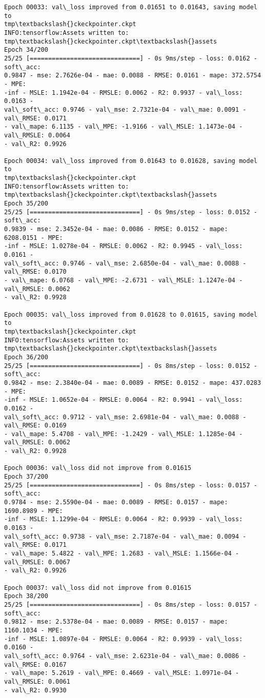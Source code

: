 \documentclass[11pt]{article}
\begin{document}
\begin{Verbatim}[commandchars=\\\{\}]
Epoch 00033: val\_loss improved from 0.01651 to 0.01643, saving model to
tmp\textbackslash{}ckeckpointer.ckpt
INFO:tensorflow:Assets written to: tmp\textbackslash{}ckeckpointer.ckpt\textbackslash{}assets
Epoch 34/200
25/25 [==============================] - 0s 9ms/step - loss: 0.0162 - soft\_acc:
0.9847 - mse: 2.7626e-04 - mae: 0.0088 - RMSE: 0.0161 - mape: 372.5754 - MPE:
-inf - MSLE: 1.1942e-04 - RMSLE: 0.0062 - R2: 0.9937 - val\_loss: 0.0163 -
val\_soft\_acc: 0.9746 - val\_mse: 2.7321e-04 - val\_mae: 0.0091 - val\_RMSE: 0.0171
- val\_mape: 6.1135 - val\_MPE: -1.9166 - val\_MSLE: 1.1473e-04 - val\_RMSLE: 0.0064
- val\_R2: 0.9926

Epoch 00034: val\_loss improved from 0.01643 to 0.01628, saving model to
tmp\textbackslash{}ckeckpointer.ckpt
INFO:tensorflow:Assets written to: tmp\textbackslash{}ckeckpointer.ckpt\textbackslash{}assets
Epoch 35/200
25/25 [==============================] - 0s 9ms/step - loss: 0.0152 - soft\_acc:
0.9839 - mse: 2.3452e-04 - mae: 0.0086 - RMSE: 0.0152 - mape: 6208.0151 - MPE:
-inf - MSLE: 1.0278e-04 - RMSLE: 0.0062 - R2: 0.9945 - val\_loss: 0.0161 -
val\_soft\_acc: 0.9746 - val\_mse: 2.6850e-04 - val\_mae: 0.0088 - val\_RMSE: 0.0170
- val\_mape: 6.0768 - val\_MPE: -2.6731 - val\_MSLE: 1.1247e-04 - val\_RMSLE: 0.0062
- val\_R2: 0.9928

Epoch 00035: val\_loss improved from 0.01628 to 0.01615, saving model to
tmp\textbackslash{}ckeckpointer.ckpt
INFO:tensorflow:Assets written to: tmp\textbackslash{}ckeckpointer.ckpt\textbackslash{}assets
Epoch 36/200
25/25 [==============================] - 0s 8ms/step - loss: 0.0152 - soft\_acc:
0.9842 - mse: 2.3840e-04 - mae: 0.0089 - RMSE: 0.0152 - mape: 437.0283 - MPE:
-inf - MSLE: 1.0652e-04 - RMSLE: 0.0064 - R2: 0.9941 - val\_loss: 0.0162 -
val\_soft\_acc: 0.9712 - val\_mse: 2.6981e-04 - val\_mae: 0.0088 - val\_RMSE: 0.0169
- val\_mape: 5.4708 - val\_MPE: -1.2429 - val\_MSLE: 1.1285e-04 - val\_RMSLE: 0.0062
- val\_R2: 0.9928

Epoch 00036: val\_loss did not improve from 0.01615
Epoch 37/200
25/25 [==============================] - 0s 8ms/step - loss: 0.0157 - soft\_acc:
0.9784 - mse: 2.5590e-04 - mae: 0.0089 - RMSE: 0.0157 - mape: 1690.8989 - MPE:
-inf - MSLE: 1.1299e-04 - RMSLE: 0.0064 - R2: 0.9939 - val\_loss: 0.0163 -
val\_soft\_acc: 0.9738 - val\_mse: 2.7187e-04 - val\_mae: 0.0094 - val\_RMSE: 0.0171
- val\_mape: 5.4822 - val\_MPE: 1.2683 - val\_MSLE: 1.1566e-04 - val\_RMSLE: 0.0067
- val\_R2: 0.9926

Epoch 00037: val\_loss did not improve from 0.01615
Epoch 38/200
25/25 [==============================] - 0s 8ms/step - loss: 0.0157 - soft\_acc:
0.9812 - mse: 2.5378e-04 - mae: 0.0089 - RMSE: 0.0157 - mape: 1160.1034 - MPE:
-inf - MSLE: 1.0897e-04 - RMSLE: 0.0064 - R2: 0.9939 - val\_loss: 0.0160 -
val\_soft\_acc: 0.9764 - val\_mse: 2.6231e-04 - val\_mae: 0.0086 - val\_RMSE: 0.0167
- val\_mape: 5.2619 - val\_MPE: 0.4669 - val\_MSLE: 1.0971e-04 - val\_RMSLE: 0.0061
- val\_R2: 0.9930


\end{Verbatim}
\end{document}

